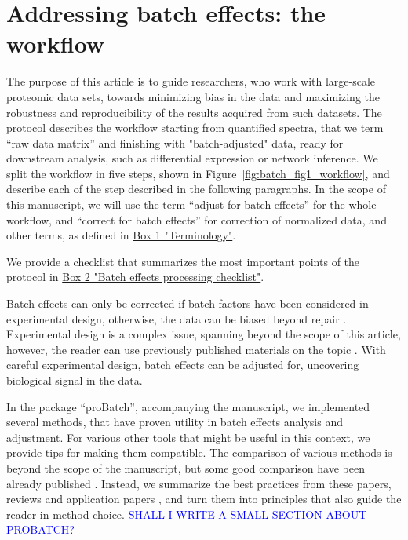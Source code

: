 \documentclass[num-refs]{wiley-article}
\begin{document}
\section{Addressing batch effects: the workflow}

The purpose of this article is to guide researchers, who work with large-scale proteomic data sets, towards minimizing bias in the data and maximizing the robustness and reproducibility of the results acquired from such datasets. The protocol describes the workflow starting from quantified spectra, that we term “raw data matrix” and finishing with "batch-adjusted" data, ready for downstream analysis, such as differential expression or network inference. We split the workflow in five steps, shown in Figure~\ref{fig:batch_fig1_workflow}, and describe each of the step described in the following paragraphs. In the scope of this manuscript, we will use the term “adjust for batch effects” for the whole workflow, and “correct for batch effects” for correction of normalized data, and other terms, as defined in  \hyperref[box:Box1_definitions]{Box 1 "Terminology"}. 

We provide a checklist that summarizes the most important points of the protocol in \hyperref[box:Box2_checklist]{Box 2 "Batch effects processing checklist"}.

Batch effects can only be corrected if batch factors have been considered in experimental design, otherwise, the data can be biased beyond repair  \cite{Hu2005, Gilad2015}. Experimental design is a complex issue, spanning beyond the scope of this article, however, the reader can use previously published materials on the topic \cite{Oberg2009, Cuklina2020}. With careful experimental design, batch effects can be adjusted for, uncovering biological signal in the data. 
 
In the package “proBatch”, accompanying the manuscript, we implemented several methods, that have proven utility in batch effects analysis and adjustment. For various other tools that might be useful in this context, we provide tips for making them compatible. The comparison of various methods is beyond the scope of the manuscript, but some good comparison have been already published \cite{Chawade:2014aa, Luo2010}. Instead, we summarize the best practices from these papers, reviews \cite{Lazar:2013aa, Leek:2010aa}  and application papers \cite{Sajic2018, Collins2017}, and turn them into principles that also guide the reader in method choice. 
\textcolor{blue}{SHALL I WRITE A SMALL SECTION ABOUT PROBATCH?}
\end{document}
